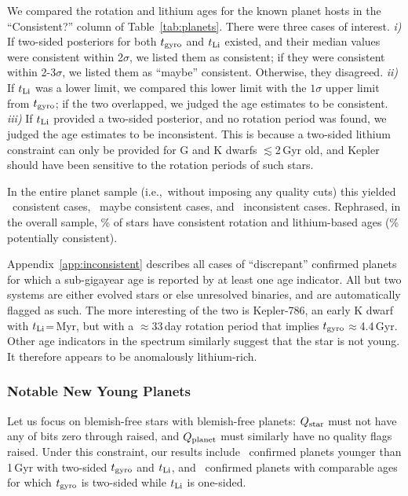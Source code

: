 \documentclass[11pt,twocolumn,tighten]{aastex63}
\begin{document}
We compared the rotation and lithium ages for the known planet hosts
in the ``Consistent?'' column of Table~\ref{tab:planets}.  There were
three cases of interest.  {\it i)} If two-sided posteriors for both
$t_{\rm gyro}$ and $t_{\rm Li}$ existed, and their median values were
consistent within 2$\sigma$, we listed them as consistent; if they
were consistent within 2-3$\sigma$, we listed them as ``maybe''
consistent.  Otherwise, they disagreed.  {\it ii)} If $t_{\rm Li}$ was
a lower limit, we compared this lower limit with the $1\sigma$ upper
limit from $t_{\rm gyro}$; if the two overlapped, we judged the age
estimates to be consistent.  {\it iii)} If $t_{\rm Li}$ provided a
two-sided posterior, and no rotation period was found, we judged the
age estimates to be inconsistent.  This is because a two-sided lithium
constraint can only be provided for G and K dwarfs $\lesssim$2\,Gyr
old, and Kepler should have been sensitive to the rotation periods of
such stars.

In the entire planet sample (i.e.,~without imposing any quality cuts)
this yielded \allagesyesconsistent\ consistent cases,
\allagesmaybeconsistent\ maybe consistent cases, and
\allagesnoconsistent\ inconsistent cases.  Rephrased, in the overall
sample, \fracconsistentallages\% of stars have consistent rotation and
lithium-based ages (\fracpotentiallyconsistentallages\% potentially
consistent).

Appendix~\ref{app:inconsistent} describes all cases of ``discrepant''
confirmed planets for which a sub-gigayear age is reported by at least
one age indicator.  All but two systems are either evolved stars or
else unresolved binaries, and are automatically flagged as such.  The
more interesting of the two is Kepler-786, an early K dwarf with
$t_{\rm Li}$=\kepseveneightsix\,Myr, but with a $\approx$33\,day
rotation period that implies $t_{\rm
gyro}$$\approx$4.4\,Gyr.  Other age indicators in the
spectrum similarly suggest that the star is not young.  It 
therefore appears to be anomalously lithium-rich. 



\subsubsection{Notable New Young Planets}
\label{subsec:notables}

Let us focus on blemish-free stars with blemish-free planets: $Q_{\rm
star}$ must not have any of bits zero through  raised, and $Q_{\rm
planet}$ must similarly have no quality flags raised.  Under this
constraint, our results include \ltonegyrhighqconfirmedtwosided\
confirmed planets younger than 1\,Gyr with two-sided $t_{\rm gyro}$
and $t_{\rm Li}$, and \ltonegyrhighqconfirmedonesided\ confirmed
planets with comparable ages for which $t_{\rm gyro}$ is two-sided
while $t_{\rm Li}$ is one-sided.
\end{document}
